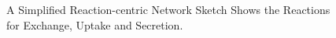  \begin{figure}[!ht]
	\begin{center}
		\caption{A Simplified Reaction-centric Network Sketch Shows the Reactions for Exchange, Uptake and Secretion.}
		\label{figure-uptake-secretion-cartoon}
	\end{center}
\end{figure}